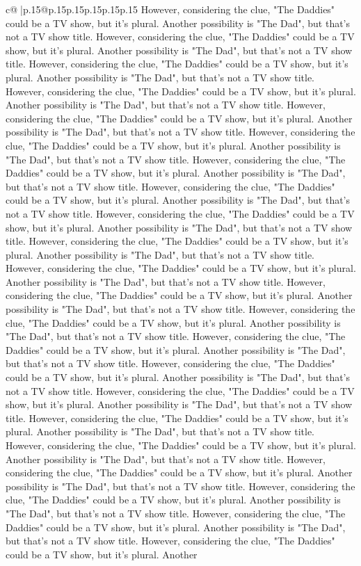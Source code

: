 \documentclass{article}
\begin{document}
{\begin{supertabular}{c@{$\;$}|p{.15\linewidth}@{}p{.15\linewidth}p{.15\linewidth}p{.15\linewidth}p{.15\linewidth}p{.15\linewidth}}
{{{However, considering the clue, "The Daddies" could be a TV show, but it's plural. Another possibility is "The Dad", but that's not a TV show title. However, considering the clue, "The Daddies" could be a TV show, but it's plural. Another possibility is "The Dad", but that's not a TV show title. However, considering the clue, "The Daddies" could be a TV show, but it's plural. Another possibility is "The Dad", but that's not a TV show title. However, considering the clue, "The Daddies" could be a TV show, but it's plural. Another possibility is "The Dad", but that's not a TV show title. However, considering the clue, "The Daddies" could be a TV show, but it's plural. Another possibility is "The Dad", but that's not a TV show title. However, considering the clue, "The Daddies" could be a TV show, but it's plural. Another possibility is "The Dad", but that's not a TV show title. However, considering the clue, "The Daddies" could be a TV show, but it's plural. Another possibility is "The Dad", but that's not a TV show title. However, considering the clue, "The Daddies" could be a TV show, but it's plural. Another possibility is "The Dad", but that's not a TV show title. However, considering the clue, "The Daddies" could be a TV show, but it's plural. Another possibility is "The Dad", but that's not a TV show title. However, considering the clue, "The Daddies" could be a TV show, but it's plural. Another possibility is "The Dad", but that's not a TV show title. However, considering the clue, "The Daddies" could be a TV show, but it's plural. Another possibility is "The Dad", but that's not a TV show title. However, considering the clue, "The Daddies" could be a TV show, but it's plural. Another possibility is "The Dad", but that's not a TV show title. However, considering the clue, "The Daddies" could be a TV show, but it's plural. Another possibility is "The Dad", but that's not a TV show title. However, considering the clue, "The Daddies" could be a TV show, but it's plural. Another possibility is "The Dad", but that's not a TV show title. However, considering the clue, "The Daddies" could be a TV show, but it's plural. Another possibility is "The Dad", but that's not a TV show title. However, considering the clue, "The Daddies" could be a TV show, but it's plural. Another possibility is "The Dad", but that's not a TV show title. However, considering the clue, "The Daddies" could be a TV show, but it's plural. Another possibility is "The Dad", but that's not a TV show title. However, considering the clue, "The Daddies" could be a TV show, but it's plural. Another possibility is "The Dad", but that's not a TV show title. However, considering the clue, "The Daddies" could be a TV show, but it's plural. Another possibility is "The Dad", but that's not a TV show title. However, considering the clue, "The Daddies" could be a TV show, but it's plural. Another possibility is "The Dad", but that's not a TV show title. However, considering the clue, "The Daddies" could be a TV show, but it's plural. Another possibility is "The Dad", but that's not a TV show title. However, considering the clue, "The Daddies" could be a TV show, but it's plural. Another }}}
\end{supertabular}}
\end{document}
